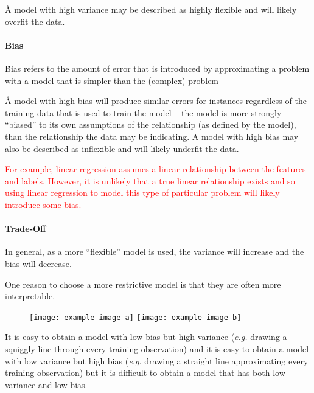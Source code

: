 \r{A model with high variance may be described as highly flexible and will likely overfit the data.}


\paragraph{Bias}
\r{Bias refers to the amount of error that is introduced by approximating a problem with a model that is simpler than the (complex) problem}

\r{A model with high bias will produce similar errors for instances regardless of the training data that is used to train the model -- the model is more strongly ``biased'' to its own assumptions of the relationship (as defined by the model), than the relationship the data may be indicating. A model with high bias may also be described as inflexible and will likely underfit the data.}


\textcolor{red}{For example, linear regression assumes a linear relationship between the features and labels. However, it is unlikely that a true linear relationship exists and so using linear regression to model this type of particular problem will likely introduce some bias.}

\paragraph{Trade-Off}


\r{In general, as a more ``flexible'' model is used, the variance will increase and the bias will decrease.}

\r{One reason to choose a more restrictive model is that they are often more interpretable.}

\begin{figure}[htp]
	\centering
	\texttt{[image: example-image-a]}\hfil
	\texttt{[image: example-image-b]}\hfil
	\caption{}
	\label{fig:basics_eval_tradeoff_examples}
\end{figure}


\r{It is easy to obtain a model with low bias but high variance (\emph{e.g.} drawing a squiggly line through every training observation) and it is easy to obtain a model with low variance but high bias (\emph{e.g.} drawing a straight line approximating every training observation) but it is difficult to obtain a model that has both low variance and low bias.}

